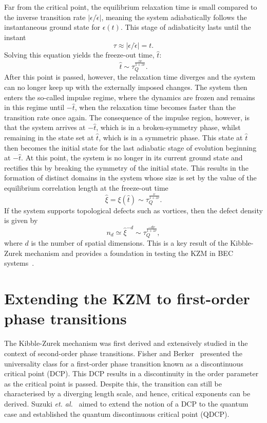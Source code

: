 Far from the critical point, the equilibrium relaxation time is small compared
to the inverse transition rate $|\epsilon/\dot{\epsilon}|$, meaning the system
adiabatically follows the instantaneous ground state for $\epsilon(t)$.
This stage of adiabaticity lasts until the instant
\begin{equation}
    \tau \approx |\epsilon/\dot{\epsilon}|=t.
    \label{eq: freeze-out-equal}
\end{equation}
Solving this equation yields the freeze-out time, $\hat{t}$:
\begin{equation}
    \hat{t} \sim \tau_Q^\frac{z\nu}{1 + z\nu}.
    \label{eq: freeze-out-scaling}
\end{equation}
After this point is passed, however, the relaxation time diverges and the system
can no longer keep up with the externally imposed changes.
The system then enters the so-called impulse regime, where the dynamics are
frozen and remains in this regime until $-\hat{t}$, when the relaxation
time becomes faster than the transition rate once again.
The consequence of the impulse region, however, is that the system arrives at
$-\hat{t}$, which is in a broken-symmetry phase, whilst remaining
in the state set at $\hat{t}$, which is in a symmetric phase.
This state at $\hat{t}$ then becomes the initial state for the last adiabatic
stage of evolution beginning at $-\hat{t}$.
At this point, the system is no longer in its current ground state and rectifies
this by breaking the symmetry of the initial state.
This results in the formation of distinct domains in the system whose size is
set by the value of the equilibrium correlation length at the freeze-out time
\begin{equation}
    \hat{\xi}=\xi(\hat{t}) \sim \tau_Q^{\frac{\nu}{1 + z\nu}}.
    \label{eq: KZM-domain-size}
\end{equation}
If the system supports topological defects such as vortices, then the defect
density is given by
\begin{equation}
    n_d \simeq \hat{\xi}^{-d} \sim \tau_Q^{\frac{-d\nu}{1+z\nu}},
\end{equation}
where $d$ is the number of spatial dimensions.
This is a key result of the Kibble-Zurek mechanism and provides a
foundation in testing the KZM in BEC systems~\cite{Damski2007, Swislocki2013,
Anquez2016, Saito2007_1, Saito2007_2}.

\section{Extending the KZM to first-order phase transitions}
The Kibble-Zurek mechanism was first derived and extensively studied in the
context of second-order phase transitions.
Fisher and Berker~\cite{Fisher1982} presented the universality class for
a first-order phase transition known as a discontinuous critical point (DCP).
This DCP results in a discontinuity in the order parameter as the critical point
is passed.
Despite this, the transition can still be characterised by a diverging length
scale, and hence, critical exponents can be derived.
Suzuki {\it et. al.}~\cite{Suzuki2015} aimed to extend the notion of a DCP to
the quantum case and established the quantum discontinuous critical point
(QDCP).

